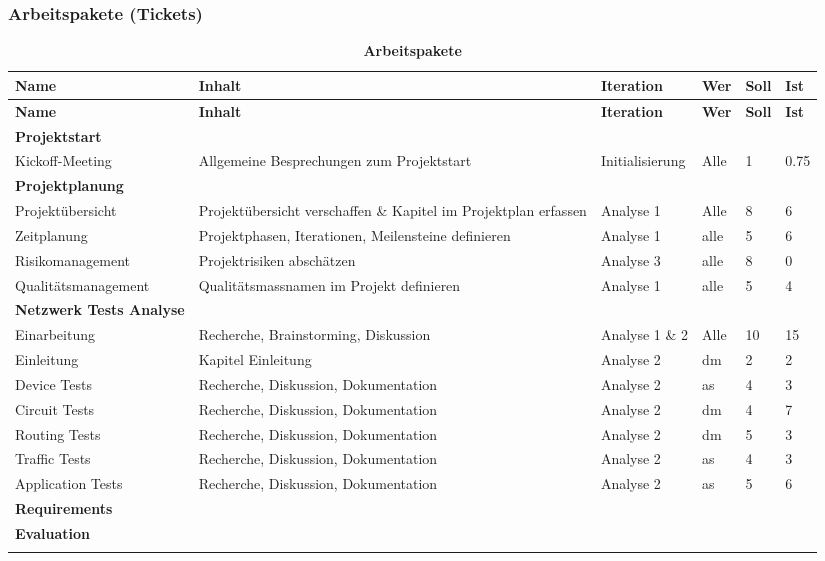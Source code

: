 \documentclass[a4,12pt]{scrartcl}
\begin{document}
\begin{landscape}
\subsubsection{Arbeitspakete (Tickets)}
\begin{longtable}{ p{5.5cm} p{8cm} l l p{1cm} p{1cm} }

\hline 
\multicolumn{1}{p{5.5cm}}{\textbf{Name}} & \multicolumn{1}{p{8cm}}{\textbf{Inhalt}} & \multicolumn{1}{l}{\textbf{Iteration}} & \multicolumn{1}{l}{\textbf{Wer}} & \multicolumn{1}{p{1cm}}{\textbf{Soll}} & \multicolumn{1}{p{1cm}}{\textbf{Ist}} \\ \hline 
\endfirsthead


\hline 
\multicolumn{1}{p{5.5cm}}{\textbf{Name}} & \multicolumn{1}{p{8cm}}{\textbf{Inhalt}} & \multicolumn{1}{l}{\textbf{Iteration}} & \multicolumn{1}{l}{\textbf{Wer}} & \multicolumn{1}{p{1cm}}{\textbf{Soll}} & \multicolumn{1}{p{1cm}}{\textbf{Ist}} \\ \hline 
\endhead


\textbf{Projektstart}&&&&\\ \addlinespace
Kickoff-Meeting & Allgemeine Besprechungen zum Projektstart & Initialisierung & Alle & 1 & 0.75 \\ \addlinespace
\textbf{Projektplanung}&&&&\\ \addlinespace
Projektübersicht & Projektübersicht verschaffen \& Kapitel im Projektplan erfassen & Analyse 1 & Alle & 8 & 6 \\
Zeitplanung & Projektphasen, Iterationen, Meilensteine definieren & Analyse 1 & alle & 5 & 6 \\
Risikomanagement & Projektrisiken abschätzen & Analyse 3 & alle & 8 & 0 \\
Qualitätsmanagement & Qualitätsmassnamen im Projekt definieren & Analyse 1& alle & 5 & 4 \\
\textbf{Netzwerk Tests Analyse}&&&&\\ \addlinespace
Einarbeitung & Recherche, Brainstorming, Diskussion & Analyse 1 \& 2& Alle & 10 & 15 \\ \addlinespace
Einleitung & Kapitel Einleitung & Analyse 2 & dm & 2 & 2 \\ \addlinespace
Device Tests & Recherche, Diskussion, Dokumentation & Analyse 2 & as & 4 & 3 \\ \addlinespace
Circuit Tests & Recherche, Diskussion, Dokumentation & Analyse 2 & dm & 4 & 7 \\ \addlinespace
Routing Tests & Recherche, Diskussion, Dokumentation & Analyse 2 & dm & 5 & 3 \\ \addlinespace
Traffic Tests & Recherche, Diskussion, Dokumentation & Analyse 2 & as & 4 & 3 \\ \addlinespace
Application Tests & Recherche, Diskussion, Dokumentation & Analyse 2 & as & 5 & 6 \\ \addlinespace
\textbf{Requirements}&&&&\\ \addlinespace
\textbf{Evaluation}&&&&\\ \addlinespace
 \addlinespace


\hline\caption{\textbf{Arbeitspakete}}
\end{longtable}
\end{landscape}
\end{document}
